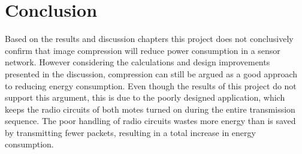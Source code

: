 \chapter{Conclusion}
Based on the results and discussion chapters this project does not conclusively confirm that image compression will reduce power consumption in a sensor network. However considering the calculations and design improvements presented in the discussion, compression can still be argued as a good approach to reducing energy consumption. Even though the results of this project do not support this argument, this is due to the poorly designed application, which keeps the radio circuits of both motes turned on during the entire transmission sequence. The poor handling of radio circuits wastes more energy than is saved by transmitting fewer packets, resulting in a total increase in energy consumption. 
